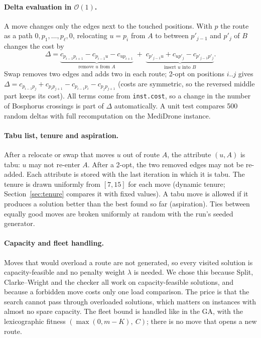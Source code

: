 \documentclass[11pt,a4paper]{article}
\theoremstyle{definition}
\theoremstyle{remark}
\newcommand{\code}[1]{\texttt{#1}}
\newcommand{\Ocal}{\mathcal{O}}
\begin{document}
\paragraph{Delta evaluation in $\Ocal(1)$.} A move changes only the edges next to the
touched positions. With $p$ the route as a path $0,p_1,\dots,p_\ell,0$, relocating
$u=p_i$ from $A$ to between $p'_{j-1}$ and $p'_j$ of $B$ changes the cost by
\[
\Delta = \underbrace{c_{p_{i-1}p_{i+1}} - c_{p_{i-1}u} - c_{up_{i+1}}}_{\text{remove $u$ from $A$}}
\;+\; \underbrace{c_{p'_{j-1}u} + c_{up'_j} - c_{p'_{j-1}p'_j}}_{\text{insert $u$ into $B$}} .
\]
Swap removes two edges and adds two in each route; 2-opt on positions $i..j$ gives
$\Delta=c_{p_{i-1}p_j}+c_{p_ip_{j+1}}-c_{p_{i-1}p_i}-c_{p_jp_{j+1}}$ (costs are symmetric,
so the reversed middle part keeps its cost). All terms come from \code{inst.cost}, so a
change in the number of Bosphorus crossings is part of $\Delta$ automatically. A unit test
compares 500 random deltas with full recomputation on the MediDrone instance.

\paragraph{Tabu list, tenure and aspiration.} After a relocate or swap that moves $u$ out
of route $A$, the attribute $(u,A)$ is tabu: $u$ may not re-enter $A$. After a 2-opt, the
two removed edges may not be re-added. Each attribute is stored with the last iteration in
which it is tabu. The tenure is drawn uniformly from $[7,15]$ for each move (dynamic
tenure; Section~\ref{sec:tenure} compares it with fixed values). A tabu move is allowed if
it produces a solution better than the best found so far (aspiration). Ties between equally
good moves are broken uniformly at random with the run's seeded generator.

\paragraph{Capacity and fleet handling.} Moves that would overload a route are not
generated, so every visited solution is capacity-feasible and no penalty weight $\lambda$
is needed. We chose this because Split, Clarke--Wright and the checker all work on
capacity-feasible solutions, and because a forbidden move costs only one load comparison.
The price is that the search cannot pass through overloaded solutions, which matters on
instances with almost no spare capacity. The fleet bound is handled like in the GA, with
the lexicographic fitness $(\max(0,m-K),\ C)$; there is no move that opens a new route.
\end{document}
